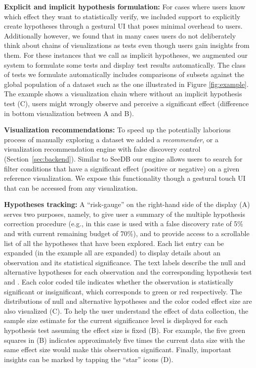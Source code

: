 \textbf{Explicit and implicit hypothesis formulation:} For cases where users know which effect they want to statistically verify, we included support to explicitly create hypotheses through a gestural UI that poses minimal overhead to users.
Additionally however, we found that in many cases users do not deliberately think about chains of visualizations as tests even though users gain insights from them.  
For these instances that we call as implicit hypotheses, we augmented our system to formulate some tests and display test results automatically. The class of tests we formulate automatically includes comparisons of subsets against the global population of a dataset such as the one illustrated in Figure \ref{fig:example}. The example shows a visualization chain where without an implicit hypothesis test (C), users might wrongly observe and perceive a significant effect (difference in bottom visualization between A and B).
 
\textbf{Visualization recommendations:} To speed up the potentially laborious process of manually exploring a dataset we added a \textit{recommender}, or a visualization recommendation engine with false discovery control (Section~\ref{sec:backend}). Similar to SeeDB \cite{seedb} our engine allows users to search for filter conditions that have a significant effect (positive or negative) on a given reference visualization. We expose this functionality though a gestural touch UI that can be accessed from any visualization. 

\textbf{Hypotheses tracking:} A ``risk-gauge'' on the right-hand side of the display (A) serves two purposes, namely, to give user a summary of the multiple hypothesis correction procedure (e.g., in this case \ainv{} is used with a false discovery rate of 5\% and with current remaining budget of 70\%), and to provide access to a scrollable list of all the hypotheses that have been explored.
Each list entry can be expanded (in the example all are expanded) to display details about an observation and its statistical significance.  
The text labels describe the null and alternative hypotheses for each observation and the corresponding hypothesis test and \pval{}. Each color coded tile indicates whether the observation is statistically significant or insignificant, which corresponds to green or red respectively.  
The distributions of null and alternative hypotheses and the color coded effect size are also visualized (C).  
To help the user understand the effect of data collection, the sample size estimate for the current significance level is displayed for each hypothesis test assuming the effect size is fixed (B).  
For example, the five green squares in (B) indicates approximately five times the current data size with the same effect size would make this observation significant.
Finally, important insights can be marked by tapping the ``star'' icons (D).


